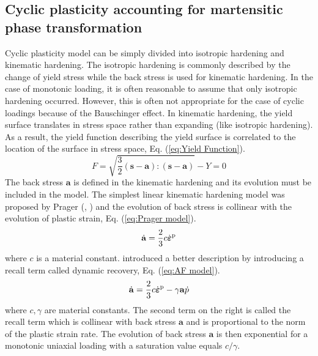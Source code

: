 \documentclass[final,5p,times,onecolumn,10pt,sort&compress]{elsarticle}
\newcommand{\bfepsilon}{{\mbox{\boldmath{$\varepsilon$}}}}
\begin{document}
\subsection{Cyclic plasticity accounting for martensitic phase transformation}

Cyclic plasticity model can be simply divided into isotropic hardening and kinematic hardening. The isotropic hardening is commonly described by the change of yield stress while the back stress is used for kinematic hardening. In the case of monotonic loading, it is often reasonable to assume that only isotropic hardening occurred. However, this is often not appropriate for the case of cyclic loadings because of the Bauschinger effect. In kinematic hardening, the yield surface translates in stress space rather than expanding (like isotropic hardening). As a result, the yield function describing the yield surface is correlated to the location of the surface in stress space, Eq.  (\ref{eq:Yield Function}).
\begin{equation}\label{eq:Yield Function}
F=\sqrt{\frac{3}{2}\left ( \mathbf{s}-\mathbf{a} \right ):\left ( \mathbf{s}-\mathbf{a} \right )}-Y=0
\end{equation}
The back stress $\mathbf{a}$ is defined in the kinematic hardening and its evolution must be included in the model. The simplest linear kinematic hardening model was proposed by Prager (\citeauthor{Prager}, \citeyear{Prager}) and the evolution of back stress is collinear with the evolution of plastic strain, Eq. (\ref{eq:Prager model}).
\begin{equation}\label{eq:Prager model}
\dot{\mathbf{a}}=\frac{2}{3}c\dot{\bfepsilon}^{\rm p}
\end{equation}
where $c$ is a material constant. \cite{Frederick2007A} introduced a better description by introducing a recall term called dynamic recovery, Eq. (\ref{eq:AF model}).
\begin{equation}\label{eq:AF model}
\dot{\mathbf{a}}=\frac{2}{3} c \dot{\bfepsilon}^{\rm p}-\gamma \mathbf{a} \dot{p}
\end{equation}
where $c, \gamma$ are material constants. The second term on the right is called the recall term which is collinear with back stress $\mathbf{a}$ and is proportional to the norm of the plastic strain rate. The evolution of back stress $\mathbf{a}$ is then exponential for a monotonic uniaxial loading with a saturation value equals $c/ \gamma$.
\end{document}
